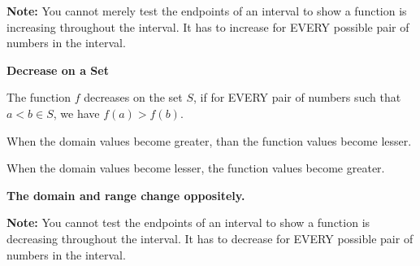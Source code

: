 \documentclass{ximera}
\begin{document}
\textbf{Note:} You cannot merely test the endpoints of an interval to show a function is increasing throughout the interval.  It has to increase for EVERY possible pair of numbers in the interval.








\begin{definition} \textbf{\textcolor{green!50!black}{Decrease on a Set}} 

The function $f$ decreases on the set $S$, if for EVERY pair of numbers such that $a < b \in S$, we have  $f(a) > f(b)$. 

When the domain values become greater, than the function values become lesser.  

When the domain values become lesser, the function values become greater.  


\textbf{\textcolor{purple!85!blue}{The domain and range change oppositely.}}



\end{definition}






\textbf{Note:} You cannot test the endpoints of an interval to show a function is decreasing throughout the interval.  It has to decrease for EVERY possible pair of numbers in the interval. 
\end{document}
